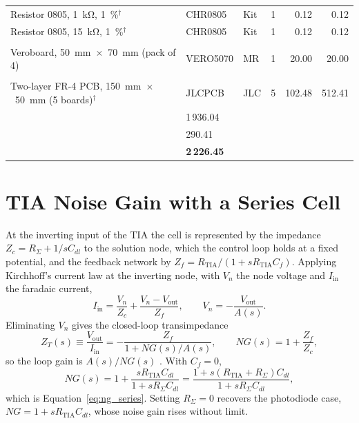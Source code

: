{\begin{xltabular}{\textwidth}{@{}>{\raggedright\arraybackslash}X l l r r r@{}}
  Resistor 0805, \SI{1}{\kilo\ohm}, \SI{1}{\percent}$^{\dagger}$ & CHR0805 & Kit & 1 & 0.12 & 0.12 \\
  Resistor 0805, \SI{15}{\kilo\ohm}, \SI{1}{\percent}$^{\dagger}$ & CHR0805 & Kit & 1 & 0.12 & 0.12 \\
  \addlinespace
   \\
  Veroboard, \SI{50}{\milli\metre}~$\times$~\SI{70}{\milli\metre} (pack of 4) & VERO5070 & MR & 1 & 20.00 & 20.00 \\
  \addlinespace
   \\
  Two-layer FR-4 PCB, \SI{150}{\milli\metre}~$\times$~\SI{50}{\milli\metre} (5 boards)$^{\dagger}$ & JLCPCB & JLC & 5 & 102.48 & 512.41 \\
  \midrule
   & 1\,936.04 \\
   & 290.41 \\
   & \textbf{2\,226.45} \\
\end{xltabular}
}

\newpage

\section{TIA Noise Gain with a Series Cell}
\label{app:tia}

At the inverting input of the TIA the cell is represented by the impedance
$Z_c = R_\Sigma + 1/sC_{dl}$ to the solution node, which the control loop
holds at a fixed potential, and the feedback network by
$Z_f = R_\mathrm{TIA}/(1 + sR_\mathrm{TIA}C_f)$. Applying Kirchhoff's current
law at the inverting node, with $V_n$ the node voltage and $I_\mathrm{in}$ the
faradaic current,
\begin{equation}
  I_\mathrm{in} = \frac{V_n}{Z_c} + \frac{V_n - V_\mathrm{out}}{Z_f},
  \qquad
  V_n = -\frac{V_\mathrm{out}}{A(s)}.
  \label{eq:app_kcl}
\end{equation}
Eliminating $V_n$ gives the closed-loop transimpedance
\begin{equation}
  Z_T(s) \equiv \frac{V_\mathrm{out}}{I_\mathrm{in}}
    = -\frac{Z_f}{1 + NG(s)/A(s)},
  \qquad
  NG(s) = 1 + \frac{Z_f}{Z_c},
  \label{eq:app_zt}
\end{equation}
so the loop gain is $A(s)/NG(s)$ \cite{graeme1996photodiode}. With $C_f = 0$,
\begin{equation}
  NG(s) = 1 + \frac{sR_\mathrm{TIA}C_{dl}}{1 + sR_\Sigma C_{dl}}
        = \frac{1 + s\left(R_\mathrm{TIA}+R_\Sigma\right)C_{dl}}{1 + sR_\Sigma C_{dl}},
\end{equation}
which is Equation~\eqref{eq:ng_series}. Setting $R_\Sigma = 0$ recovers the
photodiode case, $NG = 1 + sR_\mathrm{TIA}C_{dl}$, whose noise gain rises
without limit.

